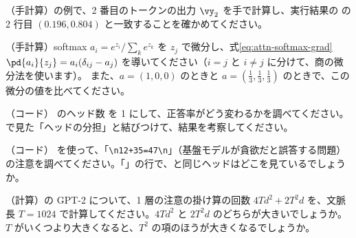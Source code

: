 \begin{exercises}
\item （手計算）の例で、2 番目のトークンの出力 $\vy_2$ を手で計算し、実行結果の  の 2 行目 $(0.196, 0.804)$ と一致することを確かめてください。
\item （手計算）\label{ex:attn-softmax-grad}softmax $a_i = e^{z_i}/\sum_k e^{z_k}$ を $z_j$ で微分し、式\eqref{eq:attn-softmax-grad} $\pd{a_i}{z_j}=a_i(\delta_{ij}-a_j)$ を導いてください（$i=j$ と $i\ne j$ に分けて、商の微分法を使います）。
また、$a=(1,0,0)$ のときと $a=(\frac13,\frac13,\frac13)$ のときで、この微分の値を比べてください。
\item （コード） のヘッド数  を 1 にして、正答率がどう変わるかを調べてください。で見た「ヘッドの分担」と結びつけて、結果を考察してください。
\item （コード） を使って、「\texttt{\textbackslash n12+35=47\textbackslash n}」（基盤モデルが貪欲だと誤答する問題）の注意を調べてください。「\code{=}」の行で、と同じヘッドはどこを見ているでしょうか。
\item （計算）の GPT-2 について、1 層の注意の掛け算の回数 $4Td^2+2T^2d$ を、文脈長 $T=1024$ で計算してください。$4Td^2$ と $2T^2d$ のどちらが大きいでしょうか。$T$ がいくつより大きくなると、$T^2$ の項のほうが大きくなるでしょうか。
\end{exercises}
